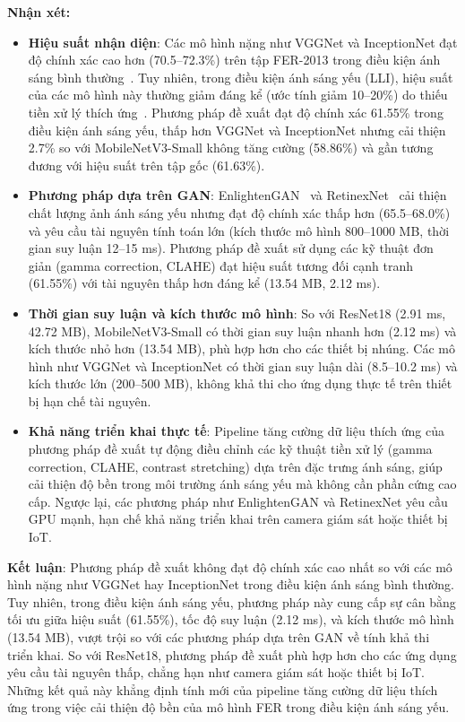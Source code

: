 \textbf{Nhận xét:}
\begin{itemize}
    \item \textbf{Hiệu suất nhận diện}: Các mô hình nặng như VGGNet và InceptionNet đạt độ chính xác cao hơn (70.5--72.3\%) trên tập FER-2013 trong điều kiện ánh sáng bình thường~\cite{goodfellow2014}. Tuy nhiên, trong điều kiện ánh sáng yếu (LLI), hiệu suất của các mô hình này thường giảm đáng kể (ước tính giảm 10--20\%) do thiếu tiền xử lý thích ứng~\cite{mollahosseini2016}. Phương pháp đề xuất đạt độ chính xác 61.55\% trong điều kiện ánh sáng yếu, thấp hơn VGGNet và InceptionNet nhưng cải thiện 2.7\% so với MobileNetV3-Small không tăng cường (58.86\%) và gần tương đương với hiệu suất trên tập gốc (61.63\%).
    \item \textbf{Phương pháp dựa trên GAN}: EnlightenGAN~\cite{zhang2019b} và RetinexNet~\cite{wang2022} cải thiện chất lượng ảnh ánh sáng yếu nhưng đạt độ chính xác thấp hơn (65.5--68.0\%) và yêu cầu tài nguyên tính toán lớn (kích thước mô hình 800--1000 MB, thời gian suy luận 12--15 ms). Phương pháp đề xuất sử dụng các kỹ thuật đơn giản (gamma correction, CLAHE) đạt hiệu suất tương đối cạnh tranh (61.55\%) với tài nguyên thấp hơn đáng kể (13.54 MB, 2.12 ms).
    \item \textbf{Thời gian suy luận và kích thước mô hình}: So với ResNet18 (2.91 ms, 42.72 MB), MobileNetV3-Small có thời gian suy luận nhanh hơn (2.12 ms) và kích thước nhỏ hơn (13.54 MB), phù hợp hơn cho các thiết bị nhúng. Các mô hình như VGGNet và InceptionNet có thời gian suy luận dài (8.5--10.2 ms) và kích thước lớn (200--500 MB), không khả thi cho ứng dụng thực tế trên thiết bị hạn chế tài nguyên.
    \item \textbf{Khả năng triển khai thực tế}: Pipeline tăng cường dữ liệu thích ứng của phương pháp đề xuất tự động điều chỉnh các kỹ thuật tiền xử lý (gamma correction, CLAHE, contrast stretching) dựa trên đặc trưng ánh sáng, giúp cải thiện độ bền trong môi trường ánh sáng yếu mà không cần phần cứng cao cấp. Ngược lại, các phương pháp như EnlightenGAN và RetinexNet yêu cầu GPU mạnh, hạn chế khả năng triển khai trên camera giám sát hoặc thiết bị IoT.
\end{itemize}

\textbf{Kết luận}: Phương pháp đề xuất không đạt độ chính xác cao nhất so với các mô hình nặng như VGGNet hay InceptionNet trong điều kiện ánh sáng bình thường. Tuy nhiên, trong điều kiện ánh sáng yếu, phương pháp này cung cấp sự cân bằng tối ưu giữa hiệu suất (61.55\%), tốc độ suy luận (2.12 ms), và kích thước mô hình (13.54 MB), vượt trội so với các phương pháp dựa trên GAN về tính khả thi triển khai. So với ResNet18, phương pháp đề xuất phù hợp hơn cho các ứng dụng yêu cầu tài nguyên thấp, chẳng hạn như camera giám sát hoặc thiết bị IoT. Những kết quả này khẳng định tính mới của pipeline tăng cường dữ liệu thích ứng trong việc cải thiện độ bền của mô hình FER trong điều kiện ánh sáng yếu.

